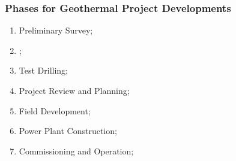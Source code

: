 \documentclass[10pt,compress,unknownkeysallowed]{beamer}
\begin{document}
\begin{frame}
 \frametitle{Phases for Geothermal Project Developments} 
    \begin{enumerate}[1.]
       \item <1-> Preliminary Survey;
       \item <2-> ; 
       \item <1-> Test Drilling;
       \item <1-> Project Review and Planning;
       \item <1-> Field Development; 
       \item <1-> Power Plant Construction;
       \item <1-> Commissioning and Operation;
    \end{enumerate}
\end{frame}
\end{document}

